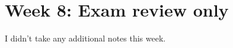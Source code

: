 \documentclass[8.01x]{subfiles}
\begin{document}
\chapter{Week 8: Exam review only}

I didn't take any additional notes this week.
\end{document}
